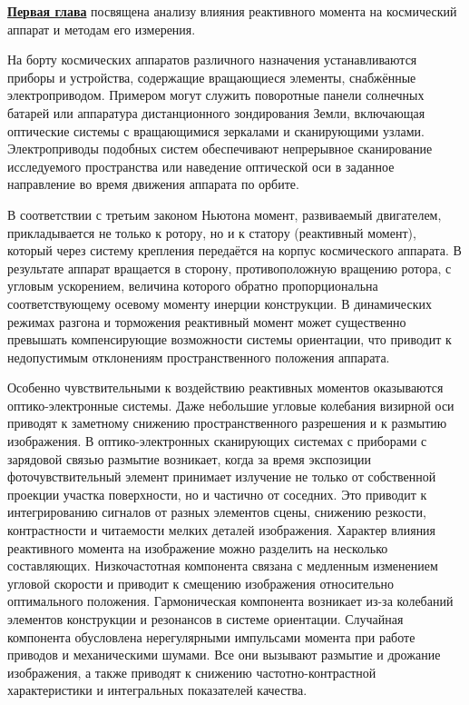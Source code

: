 \underline{\textbf{Первая глава}} посвящена анализу влияния реактивного момента на космический аппарат и методам его измерения.

На борту космических аппаратов различного назначения устанавливаются приборы и устройства, содержащие вращающиеся элементы, снабжённые электроприводом. Примером могут служить поворотные панели солнечных батарей или аппаратура дистанционного зондирования Земли, включающая оптические системы с вращающимися зеркалами и сканирующими узлами. Электроприводы подобных систем обеспечивают непрерывное сканирование исследуемого пространства или наведение оптической оси в заданное направление во время движения аппарата по орбите.

В соответствии с третьим законом Ньютона момент, развиваемый двигателем, прикладывается не только к ротору, но и к статору (реактивный момент), который через систему крепления передаётся на корпус космического аппарата. В результате аппарат вращается в сторону, противоположную вращению ротора, с угловым ускорением, величина которого обратно пропорциональна соответствующему осевому моменту инерции конструкции. В динамических режимах разгона и торможения реактивный момент может существенно превышать компенсирующие возможности системы ориентации, что приводит к недопустимым отклонениям пространственного положения аппарата.

Особенно чувствительными к воздействию реактивных моментов оказываются оптико-электронные системы. Даже небольшие угловые колебания визирной оси приводят к заметному снижению пространственного разрешения и к размытию изображения. В оптико-электронных сканирующих системах с приборами с зарядовой связью размытие возникает, когда за время экспозиции фоточувствительный элемент принимает излучение не только от собственной проекции участка поверхности, но и частично от соседних. Это приводит к интегрированию сигналов от разных элементов сцены, снижению резкости, контрастности и читаемости мелких деталей изображения. Характер влияния реактивного момента на изображение можно разделить на несколько составляющих. Низкочастотная компонента связана с медленным изменением угловой скорости и приводит к смещению изображения относительно оптимального положения. Гармоническая компонента возникает из-за колебаний элементов конструкции и резонансов в системе ориентации. Случайная компонента обусловлена нерегулярными импульсами момента при работе приводов и механическими шумами. Все они вызывают размытие и дрожание изображения, а также приводят к снижению частотно-контрастной характеристики и интегральных показателей качества.


